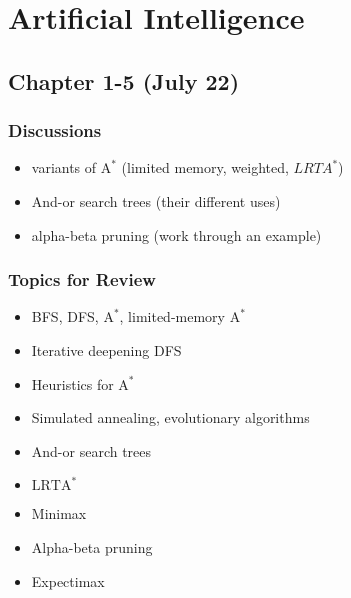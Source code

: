 \section{Artificial Intelligence}

\subsection{Chapter 1-5 (July 22)}

\subsubsection*{Discussions}
\begin{itemize}
\item variants of $\text{A}^*$ (limited memory, weighted, $LRTA^*$)
\item And-or search trees (their different uses)
\item alpha-beta pruning (work through an example)
\end{itemize}

\subsubsection*{Topics for Review}
\begin{itemize}
\item BFS, DFS, $\text{A}^*$, limited-memory $\text{A}^*$
\item Iterative deepening DFS
\item Heuristics for $\text{A}^*$
\item Simulated annealing, evolutionary algorithms
\item And-or search trees
\item $\text{LRTA}^*$
\item Minimax
\item Alpha-beta pruning
\item Expectimax
\end{itemize}
